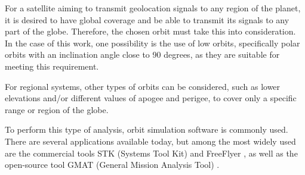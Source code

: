 For a satellite aiming to transmit geolocation signals to any region of the planet, it is desired to have global coverage and be able to transmit its signals to any part of the globe. Therefore, the chosen orbit must take this into consideration. In the case of this work, one possibility is the use of low orbits, specifically polar orbits with an inclination angle close to 90 degrees, as they are suitable for meeting this requirement.

For regional systems, other types of orbits can be considered, such as lower elevations and/or different values of apogee and perigee, to cover only a specific range or region of the globe.

To perform this type of analysis, orbit simulation software is commonly used. There are several applications available today, but among the most widely used are the commercial tools STK (Systems Tool Kit) \cite{STK} and FreeFlyer \cite{freeflyer}, as well as the open-source tool GMAT (General Mission Analysis Tool) \cite{gmat}.